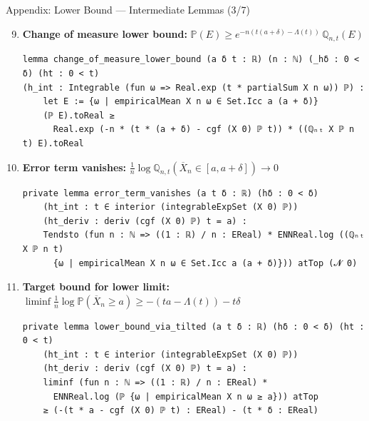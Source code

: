 \documentclass[aspectratio=169]{beamer}
\renewcommand{\P}{\mathbb{P}}
\newcommand{\Q}{\mathbb{Q}}
\begin{document}
\begin{frame}[fragile]{Appendix: Lower Bound --- Intermediate Lemmas (3/7)}
  \begin{enumerate}\setcounter{enumi}{8}
    \item \textbf{Change of measure lower bound:} $\P(E) \ge e^{-n(t(a+\delta) - \Lambda(t))}\, \Q_{n,t}(E)$
\begin{lstlisting}[basicstyle=\ttfamily\tiny]
lemma change_of_measure_lower_bound (a δ t : ℝ) (n : ℕ) (_hδ : 0 < δ) (ht : 0 < t)
(h_int : Integrable (fun ω => Real.exp (t * partialSum X n ω)) ℙ) :
    let E := {ω | empiricalMean X n ω ∈ Set.Icc a (a + δ)}
    (ℙ E).toReal ≥
      Real.exp (-n * (t * (a + δ) - cgf (X 0) ℙ t)) * ((ℚₙₜ X ℙ n t) E).toReal
\end{lstlisting}
    \item \textbf{Error term vanishes:} $\frac{1}{n}\log \Q_{n,t}(\overline{X}_n \in [a, a+\delta]) \to 0$
\begin{lstlisting}[basicstyle=\ttfamily\tiny]
private lemma error_term_vanishes (a t δ : ℝ) (hδ : 0 < δ)
    (ht_int : t ∈ interior (integrableExpSet (X 0) ℙ))
    (ht_deriv : deriv (cgf (X 0) ℙ) t = a) :
    Tendsto (fun n : ℕ => ((1 : ℝ) / n : EReal) * ENNReal.log ((ℚₙₜ X ℙ n t)
      {ω | empiricalMean X n ω ∈ Set.Icc a (a + δ)})) atTop (𝓝 0)
\end{lstlisting}
    \item \textbf{Target bound for lower limit:} $\liminf \frac{1}{n}\log\P(\overline{X}_n \ge a) \ge -(ta - \Lambda(t)) - t\delta$
\begin{lstlisting}[basicstyle=\ttfamily\tiny]
private lemma lower_bound_via_tilted (a t δ : ℝ) (hδ : 0 < δ) (ht : 0 < t)
    (ht_int : t ∈ interior (integrableExpSet (X 0) ℙ))
    (ht_deriv : deriv (cgf (X 0) ℙ) t = a) :
    liminf (fun n : ℕ => ((1 : ℝ) / n : EReal) *
      ENNReal.log (ℙ {ω | empiricalMean X n ω ≥ a})) atTop
    ≥ (-(t * a - cgf (X 0) ℙ t) : EReal) - (t * δ : EReal)
\end{lstlisting}
  \end{enumerate}
\end{frame}
\end{document}
